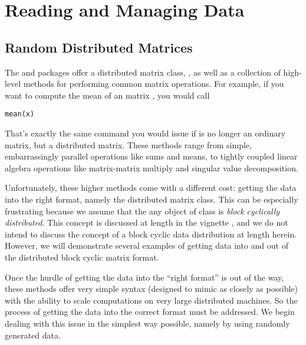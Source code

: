 \part{Reading and Managing Data}
\label{part:dmat}


\chapter{Random Distributed Matrices}
\label{sec:reader}

The  and  packages offer a distributed matrix class, , as well as a collection of high-level methods for performing common matrix operations.  For example, if you want to compute the mean of an  matrix , you would call 
\begin{lstlisting}[language=rr]
mean(x)
\end{lstlisting}
That's exactly the same command you would issue if  is no longer an ordinary  matrix, but a distributed matrix.  These methods range from simple, embarrassingly parallel operations like sums and means, to tightly coupled linear algebra operations like matrix-matrix multiply and singular value decomposition.

Unfortunately, these higher methods come with a different cost:  getting the data into the right format, namely the distributed matrix class.  This can be especially frustrating because we assume that the any object of class  is \emph{block cyclically distributed}.  This concept is discussed at length in the  vignette \citep{Schmidt2012pbdBASEvignette}, and we do not intend to discuss the concept of a block cyclic data distribution at length herein.  However, we will demonstrate several examples of getting data into and out of the distributed block cyclic matrix format.

Once the hurdle of getting the data into the ``right format'' is out of the way, these methods offer very simple syntax (designed to mimic  as closely as possible) with the ability to scale computations on very large distributed machines.  So the process of getting the data into the correct format must be addressed.  We begin dealing with this issue in the simplest way possible, namely by using randomly generated data.  

